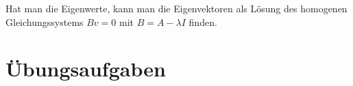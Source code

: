 Hat man die Eigenwerte, kann man die Eigenvektoren als Lösung des homogenen Gleichungssystems $Bv = 0$ mit $B = A - \lambda I$ finden.

\clearpage





\section*{Übungsaufgaben}
\begin{uebungsaufgaben}
\end{uebungsaufgaben}

